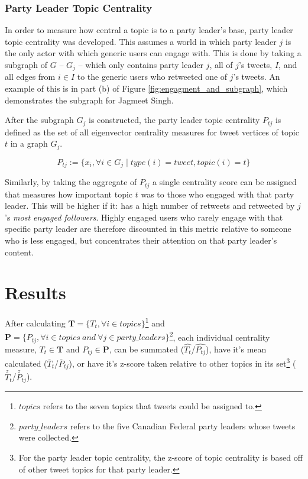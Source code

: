 \subsubsection{Party Leader Topic Centrality}

In order to measure how central a topic is to a party leader's base, party
leader topic centrality was developed. This assumes a world in which party
leader $j$ is the only actor with which generic users can engage with. This is
done by taking a subgraph of $G$ -- $G_{j}$ -- which only contains party leader
$j$, all of $j$'s tweets, $I$, and all edges from $i\in I$ to the generic users
who retweeted one of $j$'s tweets. An example of this is in part (b) of Figure
\ref{fig:engagment_and_subgraph}, which demonstrates the subgraph for Jagmeet
Singh. 

After the subgraph $G_j$ is constructed, the party leader topic
centrality $P_{tj}$ is defined as the set of all eigenvector centrality measures
for tweet vertices of topic $t$ in a graph $G_{j}$.

\begin{equation}
    P_{tj} := \{ x_i ,  \forall i \in G_{j} \mid type(i)=tweet, topic(i)=t \}
\end{equation}

Similarly, by taking the aggregate of $P_{tj}$ a single centrality score can be
assigned that measures how important topic $t$ was to those who engaged with
that party leader. This will be higher if it: has a high number of retweets
and  retweeted by $j$'s \emph{most engaged followers}. Highly engaged users who
rarely engage with that specific party leader are therefore discounted in this
metric relative to someone who is less engaged, but concentrates their attention
on that party leader's content. 

\section{Results}

After calculating $\textbf{T}=\{T_{t}, \forall i \in topics\}$\footnote{$topics$
refers to the seven topics that tweets could be assigned to.} and $\textbf{P}=\{P_{tj}, \forall i \in
topics\:and\:\forall j \in party\_leaders\}$\footnote{$party\_leaders$ refers to
the five Canadian Federal party leaders whose tweets were collected.}, each individual centrality measure, $T_{t} \in
\textbf{T}$ and $P_{tj}\in \textbf{P}$, can be summated
($\hat{T_{t}}$/$\hat{P_{tj}}$), have it's mean calculated
($\overline{T}_{t}$/$\overline{P}_{tj}$), or have it's z-score taken relative to
other topics in its set\footnote{For the party leader topic centrality, the
z-score of topic centrality is based off of other tweet topics for that party
leader.} ($\stackrel{z}{T}_{t}$/$\stackrel{z}{P}_{tj}$).

